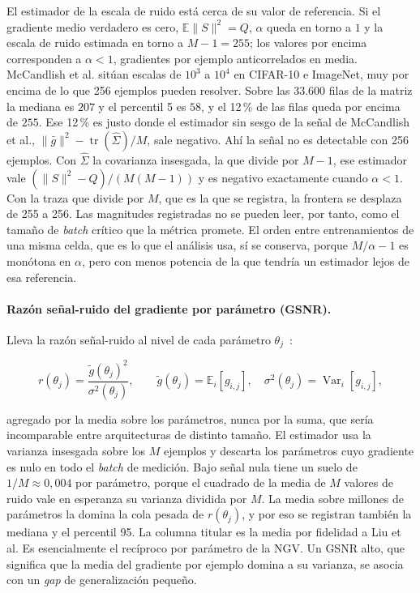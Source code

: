El estimador de la escala de ruido está cerca de su valor de referencia. Si el gradiente medio verdadero es cero, $\mathbb{E}\|S\|^2 = Q$, $\alpha$ queda en torno a $1$ y la escala de ruido estimada en torno a $M - 1 = 255$; los valores por encima corresponden a $\alpha < 1$, gradientes por ejemplo anticorrelados en media. McCandlish et al. sitúan escalas de $10^{3}$ a $10^{4}$ en CIFAR-10 e ImageNet, muy por encima de lo que 256 ejemplos pueden resolver. Sobre las 33.600 filas de la matriz la mediana es $207$ y el percentil 5 es $58$, y el 12\,\% de las filas queda por encima de $255$. Ese 12\,\% es justo donde el estimador sin sesgo de la señal de McCandlish et al., $\|\bar{g}\|^2 - \operatorname{tr}(\hat{\Sigma})/M$, sale negativo. Ahí la señal no es detectable con 256 ejemplos. Con $\hat{\Sigma}$ la covarianza insesgada, la que divide por $M - 1$, ese estimador vale $(\|S\|^2 - Q)/(M(M-1))$ y es negativo exactamente cuando $\alpha < 1$. Con la traza que divide por $M$, que es la que se registra, la frontera se desplaza de 255 a 256. Las magnitudes registradas no se pueden leer, por tanto, como el tamaño de \emph{batch} crítico que la métrica promete. El orden entre entrenamientos de una misma celda, que es lo que el análisis usa, sí se conserva, porque $M/\alpha - 1$ es monótona en $\alpha$, pero con menos potencia de la que tendría un estimador lejos de esa referencia.

\paragraph{Razón señal-ruido del gradiente por parámetro (GSNR).} Lleva la razón señal-ruido al nivel de
cada parámetro $\theta_j$~\cite{liu2020understanding}:

\begin{equation}
r(\theta_j) = \frac{\tilde{g}(\theta_j)^2}{\sigma^2(\theta_j)},
\qquad
\tilde{g}(\theta_j) = \mathbb{E}_i[g_{i,j}],
\quad
\sigma^2(\theta_j) = \operatorname{Var}_i[g_{i,j}],
\label{eq:gsnr}
\end{equation}

agregado por la media sobre los parámetros, nunca por la suma, que sería incomparable entre arquitecturas de distinto tamaño. El estimador usa la varianza insesgada sobre los $M$ ejemplos y descarta los parámetros cuyo gradiente es nulo en todo el \emph{batch} de medición. Bajo señal nula tiene un suelo de $1/M \approx 0{,}004$ por parámetro, porque el cuadrado de la media de $M$ valores de ruido vale en esperanza su varianza dividida por $M$. La media sobre millones de parámetros la domina la cola pesada de $r(\theta_j)$, y por eso se registran también la mediana y el percentil 95. La columna titular es la media por fidelidad a Liu et al. Es esencialmente el recíproco por parámetro de la NGV. Un GSNR alto, que significa que la media del gradiente por ejemplo domina a su varianza, se asocia con un \emph{gap} de generalización pequeño.

